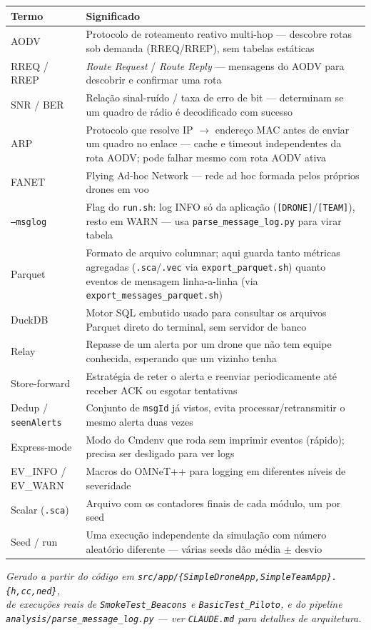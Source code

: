 \documentclass[11pt,a4paper]{article}
\begin{document}
\begin{longtable}{@{}lp{10.5cm}@{}}
\toprule
\textbf{Termo} & \textbf{Significado} \\
\midrule
\endhead
AODV & Protocolo de roteamento reativo multi-hop --- descobre rotas sob demanda (RREQ/RREP), sem tabelas estáticas \\
RREQ / RREP & \emph{Route Request} / \emph{Route Reply} --- mensagens do AODV para descobrir e confirmar uma rota \\
SNR / BER & Relação sinal-ruído / taxa de erro de bit --- determinam se um quadro de rádio é decodificado com sucesso \\
ARP & Protocolo que resolve IP $\to$ endereço MAC antes de enviar um quadro no enlace --- cache e timeout independentes da rota AODV; pode falhar mesmo com rota AODV ativa \\
FANET & Flying Ad-hoc Network --- rede ad hoc formada pelos próprios drones em voo \\
\texttt{--msglog} & Flag do \texttt{run.sh}: log INFO só da aplicação (\texttt{[DRONE]}/\texttt{[TEAM]}), resto em WARN --- usa \texttt{parse\_message\_log.py} para virar tabela \\
Parquet & Formato de arquivo columnar; aqui guarda tanto métricas agregadas (\texttt{.sca}/\texttt{.vec} via \texttt{export\_parquet.sh}) quanto eventos de mensagem linha-a-linha (via \texttt{export\_messages\_parquet.sh}) \\
DuckDB & Motor SQL embutido usado para consultar os arquivos Parquet direto do terminal, sem servidor de banco \\
Relay & Repasse de um alerta por um drone que não tem equipe conhecida, esperando que um vizinho tenha \\
Store-forward & Estratégia de reter o alerta e reenviar periodicamente até receber ACK ou esgotar tentativas \\
Dedup / \texttt{seenAlerts} & Conjunto de \texttt{msgId} já vistos, evita processar/retransmitir o mesmo alerta duas vezes \\
Express-mode & Modo do Cmdenv que roda sem imprimir eventos (rápido); precisa ser desligado para ver logs \\
EV\_INFO / EV\_WARN & Macros do OMNeT++ para logging em diferentes níveis de severidade \\
Scalar (\texttt{.sca}) & Arquivo com os contadores finais de cada módulo, um por seed \\
Seed / run & Uma execução independente da simulação com número aleatório diferente --- várias seeds dão média $\pm$ desvio \\
\bottomrule
\end{longtable}

\vspace{1cm}
\begin{center}
\small\itshape
Gerado a partir do código em \texttt{src/app/\{SimpleDroneApp,SimpleTeamApp\}.\{h,cc,ned\}}, \\
de execuções reais de \texttt{SmokeTest\_Beacons} e \texttt{BasicTest\_Piloto}, e do pipeline \\
\texttt{analysis/parse\_message\_log.py} --- ver \texttt{CLAUDE.md} para detalhes de arquitetura.
\end{center}
\end{document}
